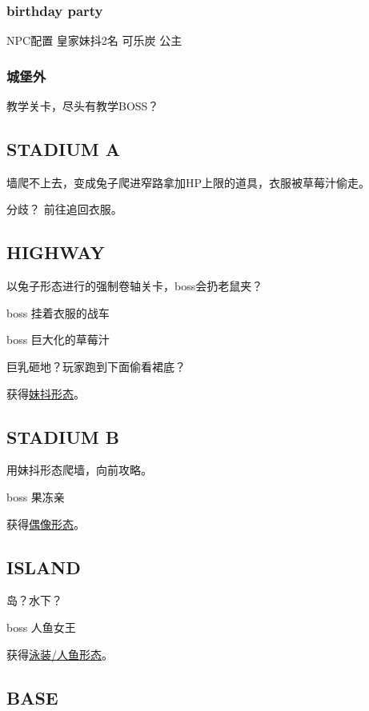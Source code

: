 \documentclass{article}
\begin{document}
\subsubsection{birthday party}

NPC配置 皇家妹抖2名 可乐炭 公主

\subsubsection{城堡外}

教学关卡，尽头有教学BOSS？

\subsection{STADIUM A}

墙爬不上去，变成兔子爬进窄路拿加HP上限的道具，衣服被草莓汁偷走。

分歧？ 前往追回衣服。

\subsection{HIGHWAY}

以兔子形态进行的强制卷轴关卡，boss会扔老鼠夹？

boss 挂着衣服的战车

boss 巨大化的草莓汁

巨乳砸地？玩家跑到下面偷看裙底？

获得\hyperref[costume_maid]{妹抖形态}。

\subsection{STADIUM B}

用妹抖形态爬墙，向前攻略。

boss 果冻亲

获得\hyperref[costume_idol]{偶像形态}。

\subsection{ISLAND}

岛？水下？

boss 人鱼女王

获得\hyperref[costume_mermaid]{泳装/人鱼形态}。

\subsection{BASE}
\end{document}
